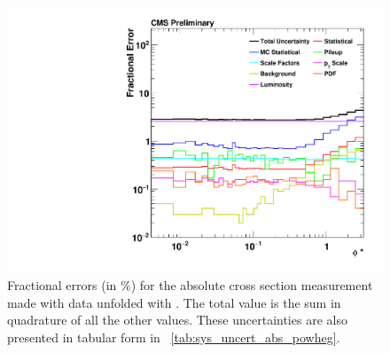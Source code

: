 \begin{figure}[!p]
    \centering
    \includegraphics[width=\textwidth]{figures/data_uncertainty_absolute_powheg_unfolded.pdf}
    \caption[
        Fractional errors (in \%) for the absolute cross section measurement
        made with data unfolded with \POWHEG.
    ]{
        Fractional errors (in \%) for the absolute cross section measurement
        made with data unfolded with \POWHEG. The total value is the sum in
        quadrature of all the other values. These uncertainties are also
        presented in tabular form in \TAB~\ref{tab:sys_uncert_abs_powheg}.
    }
    \label{fig:sys_uncert_abs_powheg}
\end{figure}
